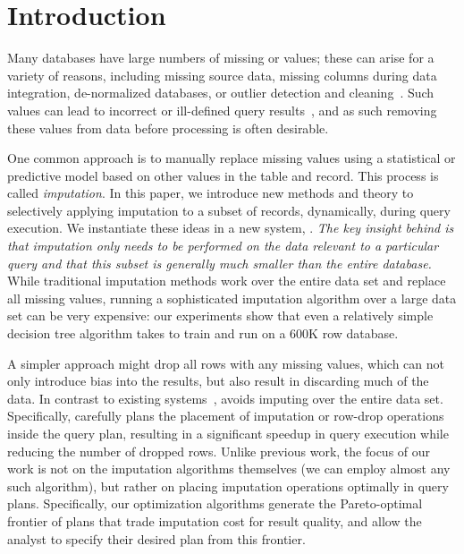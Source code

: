 \section{Introduction}

Many databases have large numbers of missing or \nullv{} values;  these can arise for a
variety of reasons, including missing source data,
missing columns during data integration, de-normalized databases, or outlier detection and
cleaning~\cite{kim2003}.  Such \nullv{} values can lead to incorrect or ill-defined query results~\cite{rubin1976}, and as such removing these values from data
before processing is often desirable.

One common approach is to manually replace missing values using a statistical or predictive model based on other values in the table and record.
This process is called \emph{imputation}.
In this paper, we introduce new methods and theory to selectively applying
imputation to a subset of records, dynamically, during query execution.
We instantiate these ideas in a new system, \ProjectName{}.  \emph{The key insight behind \ProjectName{} is that imputation
only needs to be performed on the data relevant to a particular query and
that this subset is generally much smaller than the entire database.}  
While traditional imputation methods work over the entire data set and replace all missing
values, running a sophisticated imputation algorithm over a large data set can be very
expensive: our experiments show that even a relatively simple decision tree algorithm takes \acsbaseresulthours{} to train and run
on a 600K row database.

A simpler approach might drop all rows with any missing values, which can not only introduce
bias into the results, but also result in discarding much of the data.
In contrast to existing systems~\cite{burgette2010multiple,akande2015empirical}, \ProjectName{} avoids imputing over the entire data set. Specifically, \ProjectName{}
carefully plans the placement of imputation or row-drop operations inside the query plan, resulting in a 
significant speedup in query execution while reducing the number of dropped rows. Unlike previous work, the focus of our work is not on the imputation algorithms themselves (we can employ almost any such algorithm), but rather on placing imputation operations
optimally in query plans.   Specifically, our optimization algorithms generate the
Pareto-optimal frontier of plans that trade imputation cost for result quality,
and allow the analyst to specify their desired plan from this frontier.

